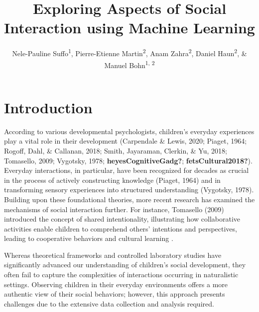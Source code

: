 \documentclass[
  man,floatsintext]{apa6}
\title{Exploring Aspects of Social Interaction using Machine Learning}
\author{Nele-Pauline Suffo\textsuperscript{1}, Pierre-Etienne Martin\textsuperscript{2}, Anam Zahra\textsuperscript{2}, Daniel Haun\textsuperscript{2}, \& Manuel Bohn\textsuperscript{1, 2}}
\date{}
\affiliation{\vspace{0.5cm}\textsuperscript{1} Institute of Psychology in Education, Leuphana University Lüneburg\\\textsuperscript{2} Max Planck Institute for Evolutionary Anthropology}
\begin{document}
\maketitle

\section{Introduction}\label{introduction}

According to various developmental psychologists, children's everyday experiences play a vital role in their development (Carpendale \& Lewis, 2020; Piaget, 1964; Rogoff, Dahl, \& Callanan, 2018; Smith, Jayaraman, Clerkin, \& Yu, 2018; Tomasello, 2009; Vygotsky, 1978; \textbf{heyesCognitiveGadg?}; \textbf{fetsCultural2018?}). Everyday interactions, in particular, have been recognized for decades as crucial in the process of actively constructing knowledge (Piaget, 1964) and in transforming sensory experiences into structured understanding (Vygotsky, 1978). Building upon these foundational theories, more recent research has examined the mechanisms of social interaction further. For instance, Tomasello (2009) introduced the concept of shared intentionality, illustrating how collaborative activities enable children to comprehend others' intentions and perspectives, leading to cooperative behaviors and cultural learning .

Whereas theoretical frameworks and controlled laboratory studies have significantly advanced our understanding of children's social development, they often fail to capture the complexities of interactions occurring in naturalistic settings. Observing children in their everyday environments offers a more authentic view of their social behaviors; however, this approach presents challenges due to the extensive data collection and analysis required.
\end{document}
